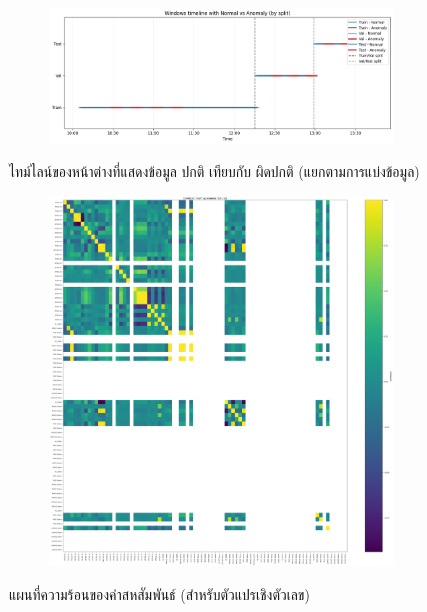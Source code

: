 \begin{figure}[ht]
\begin{center}
      \begin{subfigure}[b]{\textwidth}
          \includegraphics[width=\textwidth]{Image/slide window2.png}
    \end{subfigure}
          \caption[ไทม์ไลน์ของหน้าต่างที่แสดงข้อมูล ปกติ เทียบกับ ผิดปกติ]{ไทม์ไลน์ของหน้าต่างที่แสดงข้อมูล ปกติ เทียบกับ ผิดปกติ (แยกตามการแบ่งข้อมูล)}

    \vspace{2mm}
    \begin{subfigure}[b]{0.5\textwidth}
      \includegraphics[width=\textwidth]{Image/heatmap.png}
    \end{subfigure}
          \caption[แผนที่ความร้อนของค่าสหสัมพันธ์]{แผนที่ความร้อนของค่าสหสัมพันธ์ (สำหรับตัวแปรเชิงตัวเลข)}
\end{center}
\end{figure}


